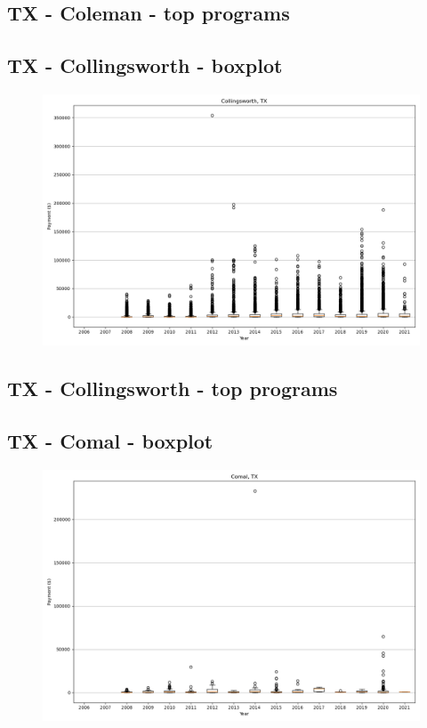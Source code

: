 \subsection*{TX - Coleman - top programs}

\newpage
\subsection*{TX - Collingsworth - boxplot}
\begin{figure}[h]
\centering
\includegraphics[width=7in]{../output/boxplots/counties/Collingsworth-TX_boxplot.png}
\end{figure}


\subsection*{TX - Collingsworth - top programs}

\newpage
\subsection*{TX - Comal - boxplot}
\begin{figure}[h]
\centering
\includegraphics[width=7in]{../output/boxplots/counties/Comal-TX_boxplot.png}
\end{figure}



